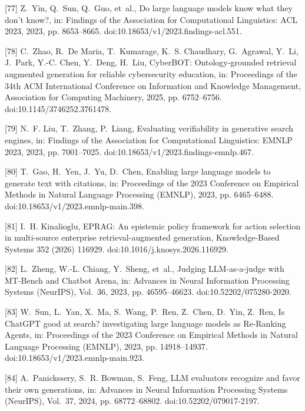 \documentclass[11pt]{article}
\begin{document}
[77] 
Z.~Yin, Q.~Sun, Q.~Guo, et~al., Do large language models know what they don't
  know?, in: Findings of the Association for Computational Linguistics: ACL
  2023, 2023, pp. 8653--8665.
  doi:10.18653/v1/2023.findings-acl.551.



[78] 
C.~Zhao, R.~{De Maria}, T.~Kumarage, K.~S. Chaudhary, G.~Agrawal, Y.~Li,
  J.~Park, Y.-C. Chen, Y.~Deng, H.~Liu, {CyberBOT}: Ontology-grounded retrieval
  augmented generation for reliable cybersecurity education, in: Proceedings of
  the 34th ACM International Conference on Information and Knowledge
  Management, Association for Computing Machinery, 2025, pp. 6752--6756.
  doi:10.1145/3746252.3761478.



[79] 
N.~F. Liu, T.~Zhang, P.~Liang, Evaluating verifiability in generative search
  engines, in: Findings of the Association for Computational Linguistics: EMNLP
  2023, 2023, pp. 7001--7025.
  doi:10.18653/v1/2023.findings-emnlp.467.



[80] 
T.~Gao, H.~Yen, J.~Yu, D.~Chen, Enabling large language models to generate text
  with citations, in: Proceedings of the 2023 Conference on Empirical Methods
  in Natural Language Processing (EMNLP), 2023, pp. 6465--6488.
  doi:10.18653/v1/2023.emnlp-main.398.



[81] 
I.~H. Kinalioglu, {EPRAG}: An epistemic policy framework for action selection
  in multi-source enterprise retrieval-augmented generation, Knowledge-Based
  Systems 352 (2026) 116929.
  doi:10.1016/j.knosys.2026.116929.



[82] 
L.~Zheng, W.-L. Chiang, Y.~Sheng, et~al., Judging {LLM}-as-a-judge with
  {MT-Bench} and {Chatbot Arena}, in: Advances in Neural Information Processing
  Systems (NeurIPS), Vol.~36, 2023, pp. 46595--46623.
  doi:10.52202/075280-2020.



[83] 
W.~Sun, L.~Yan, X.~Ma, S.~Wang, P.~Ren, Z.~Chen, D.~Yin, Z.~Ren, Is {ChatGPT}
  good at search? investigating large language models as {Re-Ranking Agents},
  in: Proceedings of the 2023 Conference on Empirical Methods in Natural
  Language Processing (EMNLP), 2023, pp. 14918--14937.
  doi:10.18653/v1/2023.emnlp-main.923.



[84] 
A.~Panickssery, S.~R. Bowman, S.~Feng, {LLM} evaluators recognize and favor
  their own generations, in: Advances in Neural Information Processing Systems
  (NeurIPS), Vol.~37, 2024, pp. 68772--68802.
  doi:10.52202/079017-2197.
\end{document}
